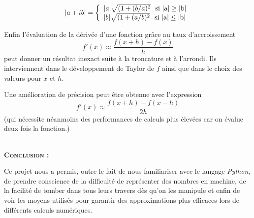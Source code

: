 \documentclass{article}
\begin{document}
\[|a + ib| = \left\lbrace\begin{array}l |a|  \sqrt{(1 + (b/a)^2} \rm~~si~ | a | \ge |b|  \\ | b |  \sqrt{(1 + (a/b)^2}\rm~~si~ | a | \leq | b |\end{array}\right. \]

Enfin l’évaluation de la dérivée d'une fonction grâce au taux d’accroissement \[ f'(x) \approx \frac{f(x+h)-f(x)}{h}\] peut donner un résultat inexact suite à la troncature et à l’arrondi. Ils interviennent dans le développement de Taylor de $f$ ainsi que dans le choix des valeurs pour $x$ et $h$. 

Une amélioration de précision peut être obtenue avec l’expression \[ f'(x) \approx \frac{f(x+h)-f(x-h)}{2h}\] (qui nécessite néanmoins des performances de calculs plus élevées car on évalue deux fois la fonction.)\bigskip


\ \\
\textbf{\textsc{Conclusion :}}

Ce projet nous a permis, outre le fait de nous familiariser avec le langage \textit{Python}, de prendre conscience de la difficulté de représenter des nombres en machine, de la facilité de tomber dans tous leurs travers dès qu'on les manipule et enfin de voir les moyens utilisés pour garantir des approximations plus efficaces lors de différents calculs numériques.
\end{document}
